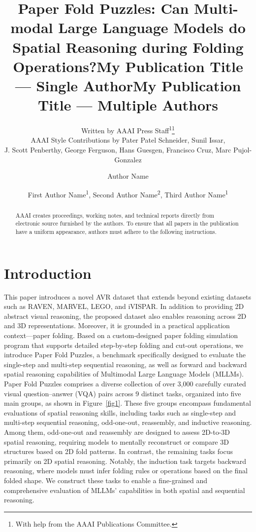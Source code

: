 \documentclass[letterpaper]{article} %
\title{Paper Fold Puzzles: Can Multi-modal Large Language Models do Spatial Reasoning during Folding Operations?}
\author{
    Written by AAAI Press Staff\textsuperscript{\rm 1}\thanks{With help from the AAAI Publications Committee.}\\
    AAAI Style Contributions by Pater Patel Schneider,
    Sunil Issar,\\
    J. Scott Penberthy,
    George Ferguson,
    Hans Guesgen,
    Francisco Cruz\equalcontrib,
    Marc Pujol-Gonzalez\equalcontrib
}
\title{My Publication Title --- Single Author}
\author {
    Author Name
}
\title{My Publication Title --- Multiple Authors}
\author {
    First Author Name\textsuperscript{\rm 1},
    Second Author Name\textsuperscript{\rm 2},
    Third Author Name\textsuperscript{\rm 1}
}
\begin{document}
\maketitle

\begin{abstract}
AAAI creates proceedings, working notes, and technical reports directly from electronic source furnished by the authors. To ensure that all papers in the publication have a uniform appearance, authors must adhere to the following instructions.
\end{abstract}


\section{Introduction}
This paper introduces a novel AVR dataset that extends beyond existing datasets such as RAVEN, MARVEL, LEGO, and iVISPAR. In addition to providing 2D abstract visual reasoning, the proposed dataset also enables reasoning across 2D and 3D representations. Moreover, it is grounded in a practical application context—paper folding.
Based on a custom-designed paper folding simulation program that supports detailed step-by-step folding and cut-out operations, we introduce Paper Fold Puzzles, a benchmark specifically designed to evaluate the single-step and multi-step sequential reasoning, as well as forward and backward spatial reasoning capabilities of Multimodal Large Language Models (MLLMs). Paper Fold Puzzles comprises a diverse collection of over 3,000 carefully curated visual question–answer (VQA) pairs across 9 distinct tasks, organized into five main groups, as shown in Figure~\ref{fig1}. These five groups encompass fundamental evaluations of spatial reasoning skills, including tasks such as single-step and multi-step sequential reasoning, odd-one-out, reassembly, and inductive reasoning. Among them, odd-one-out and reassembly are designed to assess 2D-to-3D spatial reasoning, requiring models to mentally reconstruct or compare 3D structures based on 2D fold patterns. In contrast, the remaining tasks focus primarily on 2D spatial reasoning. Notably, the induction task targets backward reasoning, where models must infer folding rules or operations based on the final folded shape. We construct these tasks to enable a fine-grained and comprehensive evaluation of MLLMs’ capabilities in both spatial and sequential reasoning.
\end{document}
